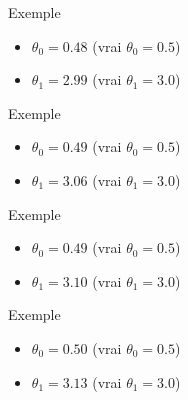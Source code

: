 \begin{frame}{Exemple}
  \begin{itemize}
    \item $\theta_0 = 0.48$ (vrai $\theta_0 = 0.5$)
    \item $\theta_1 = 2.99$ (vrai $\theta_1 = 3.0$)
  \end{itemize}
\end{frame}

\begin{frame}{Exemple}
  \begin{itemize}
    \item $\theta_0 = 0.49$ (vrai $\theta_0 = 0.5$)
    \item $\theta_1 = 3.06$ (vrai $\theta_1 = 3.0$)
  \end{itemize}
\end{frame}

\begin{frame}{Exemple}
  \begin{itemize}
    \item $\theta_0 = 0.49$ (vrai $\theta_0 = 0.5$)
    \item $\theta_1 = 3.10$ (vrai $\theta_1 = 3.0$)
  \end{itemize}
\end{frame}

\begin{frame}{Exemple}
  \begin{itemize}
    \item $\theta_0 = 0.50$ (vrai $\theta_0 = 0.5$)
    \item $\theta_1 = 3.13$ (vrai $\theta_1 = 3.0$)
  \end{itemize}
\end{frame}
